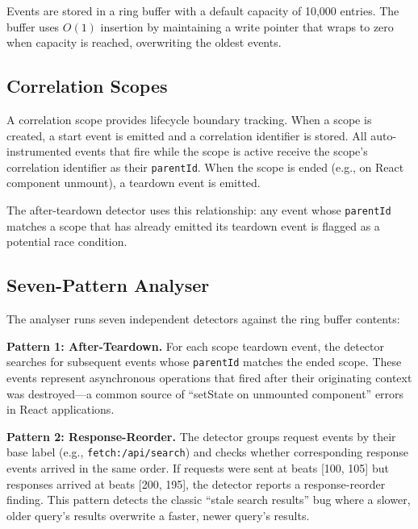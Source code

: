 \documentclass[11pt,a4paper]{article}
\begin{document}
Events are stored in a ring buffer with a default capacity of 10,000 entries. The buffer uses $O(1)$ insertion by maintaining a write pointer that wraps to zero when capacity is reached, overwriting the oldest events.

\subsection{Correlation Scopes}

A correlation scope provides lifecycle boundary tracking. When a scope is created, a start event is emitted and a correlation identifier is stored. All auto-instrumented events that fire while the scope is active receive the scope's correlation identifier as their \texttt{parentId}. When the scope is ended (e.g., on React component unmount), a teardown event is emitted.

The after-teardown detector uses this relationship: any event whose \texttt{parentId} matches a scope that has already emitted its teardown event is flagged as a potential race condition.

\subsection{Seven-Pattern Analyser}

The analyser runs seven independent detectors against the ring buffer contents:

\textbf{Pattern 1: After-Teardown.} For each scope teardown event, the detector searches for subsequent events whose \texttt{parentId} matches the ended scope. These events represent asynchronous operations that fired after their originating context was destroyed---a common source of ``setState on unmounted component'' errors in React applications.

\textbf{Pattern 2: Response-Reorder.} The detector groups request events by their base label (e.g., \texttt{fetch:/api/search}) and checks whether corresponding response events arrived in the same order. If requests were sent at beats [100, 105] but responses arrived at beats [200, 195], the detector reports a response-reorder finding. This pattern detects the classic ``stale search results'' bug where a slower, older query's results overwrite a faster, newer query's results.
\end{document}

